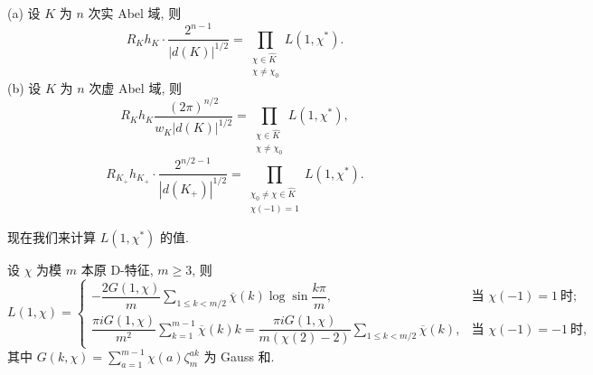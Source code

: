 \begin{lemma}\label{lem:ch6-3}
(a) 设 $K$ 为 $n$ 次实 Abel 域, 则
\[
  R_Kh_K\cdot\frac{2^{n-1}}{|d(K)|^{1/2}}=\prod_{\substack{\chi\in\widehat{K}\\ \chi\neq\chi_0}}L(1,\chi^*).
\]
(b) 设 $K$ 为 $n$ 次虚 Abel 域, 则
\[
  R_Kh_K\frac{(2\pi)^{n/2}}{w_K|d(K)|^{1/2}}=\prod_{\substack{\chi\in\widehat{K}\\ \chi\neq\chi_0}}L(1,\chi^*),
\]
\[
  R_{K_+}h_{K_+}\cdot\frac{2^{n/2-1}}{|d(K_+)|^{1/2}}=\prod_{\substack{\chi_0\neq\chi\in\widehat{K}\\ \chi(-1)=1}}L(1,\chi^*).
\]
\end{lemma}

现在我们来计算 $L(1,\chi^*)$ 的值.

\begin{lemma}\label{lem:ch6-4}
设 $\chi$ 为模 $m$ 本原 D-特征, $m\geqslant 3$, 则
\[
  L(1,\chi)=\begin{cases}
    -\dfrac{2G(1,\chi)}{m}\sum\limits_{1\leqslant k<m/2}\overline{\chi}(k)\log\sin\dfrac{k\pi}{m}, & \text{当 } \chi(-1)=1\ \text{时};\\[1em]
    \dfrac{\pi iG(1,\chi)}{m^2}\sum\limits_{k=1}^{m-1}\overline{\chi}(k)k=\dfrac{\pi iG(1,\chi)}{m(\chi(2)-2)}\sum\limits_{1\leqslant k<m/2}\overline{\chi}(k), & \text{当 } \chi(-1)=-1\ \text{时},
  \end{cases}
\]
其中 $G(k,\chi)=\sum_{a=1}^{m-1}\chi(a)\zeta_m^{ak}$ 为 Gauss 和.
\end{lemma}

